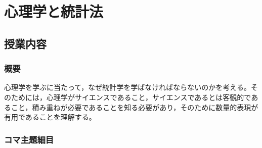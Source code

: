 \section{心理学と統計法}
\label{b01_Introduction}
\subsection{授業内容}
\subsubsection{概要}
心理学を学ぶに当たって，なぜ統計学を学ばなければならないのかを考える。そのためには，心理学がサイエンスであること，サイエンスであるとは客観的であること，積み重ねが必要であることを知る必要があり，そのために数量的表現が有用であることを理解する。
\subsubsection{コマ主題細目}
